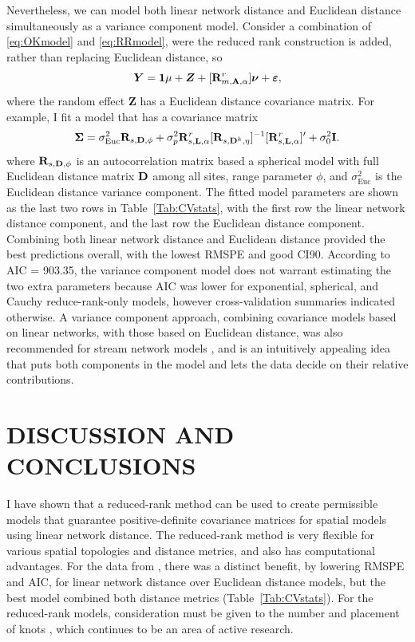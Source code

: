\documentclass[11pt, titlepage]{article}\usepackage[]{graphicx}\usepackage[]{color}
\begin{document}
\begin{spacing}{1.9}
\begin{flushleft}
Nevertheless, we can model both linear network distance and Euclidean distance simultaneously as a variance component model.  Consider a combination of \ref{eq:OKmodel} and \ref{eq:RRmodel}, were the reduced rank construction is added, rather than replacing Euclidean distance, so
\[
\bm Y = \mathbf{1}\mu + \bm Z + [\mathbf{R}^r_{m,\mathbf{A},\alpha}]\mbox{\boldmath $\nu$} + \mbox{\boldmath $\varepsilon$},
\]
where the random effect $\bm Z$ has a Euclidean distance covariance matrix. For example, I fit a model that has a covariance matrix
\[
\mbox{\boldmath $\Sigma$} = \sigma^2_{\textrm{Euc}}\mathbf{R}_{s,\mathbf{D},\phi} + \sigma^2_p\mathbf{R}^r_{s,\mathbf{L},\alpha}[\mathbf{R}_{s,\mathbf{D}^k,\eta}]^{-1}[\mathbf{R}^r_{s,\mathbf{L},\alpha}]^{\prime} + \sigma^2_0\mathbf{I}.
\]
where $\mathbf{R}_{s,\mathbf{D},\phi}$ is an autocorrelation matrix based a spherical model with full Euclidean distance matrix $\mathbf{D}$ among all sites, range parameter $\phi$, and $\sigma^2_{\textrm{Euc}}$ is the Euclidean distance variance component. The fitted model parameters are shown as the last two rows in Table~\ref{Tab:CVstats}, with the first row the linear network distance component, and the last row the Euclidean distance component.  Combining both linear network distance and Euclidean distance provided the best predictions overall, with the lowest RMSPE and good CI90. According to AIC = 903.35, the variance component model does not warrant estimating the two extra parameters because AIC was lower for exponential, spherical, and Cauchy reduce-rank-only models, however cross-validation summaries indicated otherwise.  A variance component approach, combining covariance models based on linear networks, with those based on Euclidean distance, was also recommended for stream network models \citep{Ver:Pete:Move:2010}, and is an intuitively appealing idea that puts both components in the model and lets the data decide on their relative contributions.

\section*{DISCUSSION AND CONCLUSIONS}

I have shown that a reduced-rank method can be used to create permissible models that guarantee positive-definite covariance matrices for spatial models using linear network distance.  The reduced-rank method is very flexible for various spatial topologies and distance metrics, and also has computational advantages.  For the data from \citet{Ladl:Avga:Whea:Boyc:pred:2016}, there was a distinct benefit, by lowering RMSPE and AIC, for linear network distance over Euclidean distance models, but the best model combined both distance metrics (Table~\ref{Tab:CVstats}).  For the reduced-rank models, consideration must be given to the number and placement of knots \citep{Rupp:Wand:Carr:semi:2003, Gelf:Bane:Finl:spat:2012}, which continues to be an area of active research.


\end{flushleft}
\end{spacing}
\end{document}
